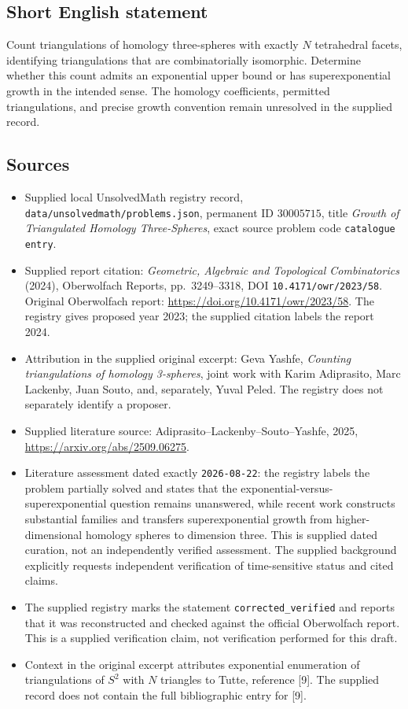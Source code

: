\documentclass[11pt]{article}
\begin{document}
\subsection{Short English statement}
Count triangulations of homology three-spheres with exactly \(N\) tetrahedral facets, identifying triangulations that are combinatorially isomorphic. Determine whether this count admits an exponential upper bound or has superexponential growth in the intended sense. The homology coefficients, permitted triangulations, and precise growth convention remain unresolved in the supplied record.
\subsection{Sources}
\begin{itemize}
\item Supplied local UnsolvedMath registry record, \texttt{data/unsolvedmath/problems.json}, permanent ID \(30005715\), title \emph{Growth of Triangulated Homology Three-Spheres}, exact source problem code \texttt{catalogue entry}.
\item Supplied report citation: \emph{Geometric, Algebraic and Topological Combinatorics} (2024), Oberwolfach Reports, pp.\ 3249--3318, DOI \texttt{10.4171/owr/2023/58}. Original Oberwolfach report: \url{https://doi.org/10.4171/owr/2023/58}. The registry gives proposed year 2023; the supplied citation labels the report 2024.
\item Attribution in the supplied original excerpt: Geva Yashfe, \emph{Counting triangulations of homology 3-spheres}, joint work with Karim Adiprasito, Marc Lackenby, Juan Souto, and, separately, Yuval Peled. The registry does not separately identify a proposer.
\item Supplied literature source: Adiprasito--Lackenby--Souto--Yashfe, 2025, \url{https://arxiv.org/abs/2509.06275}.
\item Literature assessment dated exactly \texttt{2026-08-22}: the registry labels the problem partially solved and states that the exponential-versus-superexponential question remains unanswered, while recent work constructs substantial families and transfers superexponential growth from higher-dimensional homology spheres to dimension three. This is supplied dated curation, not an independently verified assessment. The supplied background explicitly requests independent verification of time-sensitive status and cited claims.
\item The supplied registry marks the statement \texttt{corrected\_verified} and reports that it was reconstructed and checked against the official Oberwolfach report. This is a supplied verification claim, not verification performed for this draft.
\item Context in the original excerpt attributes exponential enumeration of triangulations of \(S^2\) with \(N\) triangles to Tutte, reference [9]. The supplied record does not contain the full bibliographic entry for [9].
\end{itemize}
\end{document}
